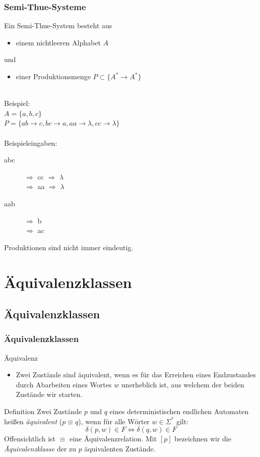 \begin{frame}
\frametitle{Semi-Thue-Systeme}
Ein Semi-Thue-System besteht aus
\begin{itemize}
	\item einem nichtleeren Alphabet $A$
\end{itemize}
und
\begin{itemize}
	\item einer Produktionsmenge $P \subset \{A^* \rightarrow A^*\}$
\end{itemize}~\\
Beispiel:~\\
$A = \{a, b, c\}$~\\
$P = \{ab \rightarrow c, bc \rightarrow a, aa \rightarrow \lambda, cc \rightarrow \lambda\}$~\\~\\
Beispieleingaben:
\begin{description}
	\item[abc] $\Rightarrow$ cc $\Rightarrow$ $\lambda$~\\
	$\Rightarrow$ aa $\Rightarrow$ $\lambda$~\\
	\item[aab] $\Rightarrow$ b~\\
	$\Rightarrow$ ac
\end{description}
Produktionen sind nicht immer eindeutig.
\end{frame}

\section{Äquivalenzklassen}
\subsection{Äquivalenzklassen}
\begin{frame}
	\frametitle{Äquivalenzklassen}
	\begin{block} {Äquivalenz}
		\begin{itemize}
			\item Zwei Zustände sind äquivalent, wenn es für das Erreichen eines Endzustandes durch Abarbeiten eines Wortes $w$ unerheblich ist, aus welchem der beiden Zustände wir starten.
		\end{itemize}
	\end{block}
	\begin{block} {Definition}
  Zwei Zustände $p$ und $q$ eines deterministischen endlichen Automaten heißen \emph{äquivalent} ($p \equiv q$),
  wenn für alle Wörter $w\in\Sigma^*$ gilt:
  \[
   \delta(p, w)\in F \Leftrightarrow \delta(q, w)\in F
  \]
  Offensichtlich ist $\equiv$ eine Äquivalenzrelation. Mit $[p]$ bezeichnen wir die \emph{Äquivalenzklasse} der zu $p$ äquivalenten Zustände.
  \end{block}
\end{frame}

